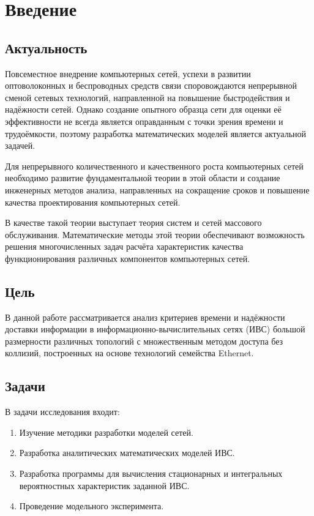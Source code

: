 \documentclass[oneside, draft, 14pt, a4paper]{extreport}
\begin{document}
\renewcommand{\contentsname}{\centering Оглавление}
\tableofcontents
\thispagestyle{empty}

\chapter*{\centering Введение}

\section*{\centering Актуальность}
Повсеместное внедрение компьютерных сетей, успехи в развитии оптоволоконных и беспроводных средств связи
споровождаются непрерывной сменой сетевых технологий, направленной на повышение быстродействия
и надёжности сетей. Однако создание опытного образца сети для оценки её эффективности не всегда является
оправданным с точки зрения времени и трудоёмкости, поэтому разработка математических моделей является актуальной задачей.

Для непрерывного количественного и качественного роста компьютерных сетей необходимо развитие фундаментальной
теории в этой области и создание инженерных методов анализа, направленных на сокращение сроков и повышение
качества проектирования компьютерных сетей.

В качестве такой теории выступает теория систем и сетей массового обслуживания.
Математические методы этой теории обеспечивают возможность решения многочисленных задач расчёта
характеристик качества функционирования различных компонентов компьютерных сетей.

\section*{\centering Цель}
В данной работе рассматривается анализ критериев времени и надёжности доставки информации в информационно-вычислительных
сетях (ИВС) большой размерности различных топологий с множественным методом доступа без коллизий,
построенных на основе технологий семейства Ethernet.

\section*{\centering Задачи}
В задачи исследования входит:
\begin{enumerate}
	\item Изучение методики разработки моделей сетей.
	\item Разработка аналитических математических моделей ИВС.
	\item Разработка программы для вычисления стационарных и интегральных вероятностных характеристик заданной ИВС.
	\item Проведение модельного эксперимента.
\end{enumerate}
\end{document}
